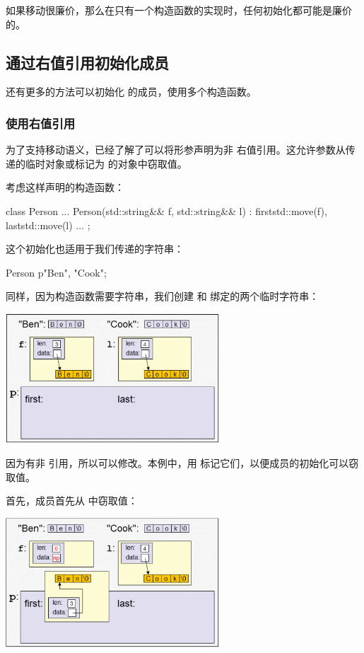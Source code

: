 如果移动很廉价，那么在只有一个构造函数的实现时，任何初始化都可能是廉价的。

\subsection{通过右值引用初始化成员}

还有更多的方法可以初始化  的成员，使用多个构造函数。

\subsubsection{使用右值引用}

为了支持移动语义，已经了解了可以将形参声明为非  右值引用。这允许参数从传递的临时对象或标记为  的对象中窃取值。

考虑这样声明的构造函数：

\begin{cppcode}
class Person {
	...
	Person(std::string&& f, std::string&& l)
	: first{std::move(f)}, last{std::move(l)} {
	}
	...
};
\end{cppcode}

这个初始化也适用于我们传递的字符串：

\begin{cppcode}
Person p{"Ben", "Cook"};
\end{cppcode}

同样，因为构造函数需要字符串，我们创建  和  绑定的两个临时字符串：

\begin{center}
	\includegraphics[width=0.6\textwidth]{part1/ch4/images/8}
\end{center}

因为有非  引用，所以可以修改。本例中，用  标记它们，以便成员的初始化可以窃取值。

首先，成员首先从  中窃取值：

\begin{center}
	\includegraphics[width=0.6\textwidth]{part1/ch4/images/9}
\end{center}

